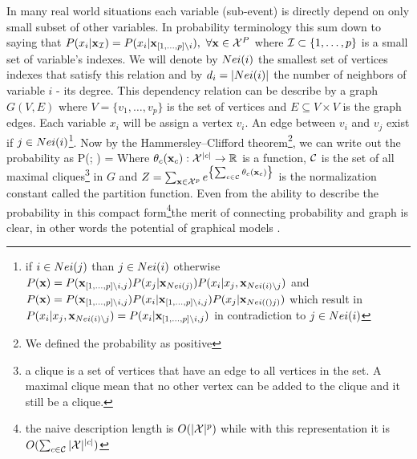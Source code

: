 In many real world situations each variable (sub-event) is directly depend on only small subset of other variables.
In probability terminology this sum down to saying that $P(x_i |{\bf x}_{{\cal I}}) = P(x_i|{\bf x}_{[1,\ldots,p] \setminus i}),\  \forall {\bf x} \in {\cal X}^{P}$ where ${\cal I} \subset \{1,\ldots,p\}$  is a small set of variable's indexes.
We will denote by $Nei(i)$ the smallest set of vertices indexes that satisfy this relation and by $d_i = |Nei(i)|$ the number of neighbors of variable $i$ - its degree.  
This dependency relation can be describe by a graph $G(V,E)$ where $V = \{v_1,\ldots, v_p\}$ is the set of vertices and  $E \subseteq V \times V$ is the graph edges.
Each variable $x_i$ will be assign a vertex $v_i$. 
An edge between $v_i$ and $v_j$ exist if  $j \in Nei(i)$\footnote{if $i \in Nei(j)$ than $j \in Nei(i)$ otherwise $P({\bf x}) = P({\bf x}_{[1,\ldots,p]\setminus i,j}) P(x_j|{\bf x}_{Nei(j)}) P(x_i|x_j,{\bf x}_{Nei(i)\setminus j})$ and $P({\bf x}) = P({\bf x}_{[1,\ldots,p]\setminus i,j}) P(x_i|{\bf x}_{[1,\ldots,p]\setminus i,j}) P(x_j|{\bf x}_{Nei(()j)})$ which result in $P(x_i|x_j,{\bf x}_{Nei(i)\setminus j}) =   P(x_i|{\bf x}_{[1,\ldots,p]\setminus i,j})$ in contradiction to $j \in Nei(i)$}.
Now by the Hammersley–Clifford theorem\cite{hammersley1971markov}\footnote{We defined the probability as positive}, we can write out the probability as
\be
\label{eq:ciluqe_prob}
P(\xx; \thetav) =  
\ee
Where $\theta_{c}({\bf x}_{c}): {\cal X}^{|c|} \to \mathbb{R}$  is a function, ${\cal C}$ is the set of all maximal cliques\footnote{a clique is a set of vertices that have an edge to all vertices in the set. A maximal clique mean that no other vertex can be added to the clique and it still be a clique.} in $G$ and $Z = \sum_{{\bf x} \in {\cal X}^p} e^{\left\{\sum_{c \in {\cal C}}\theta_{c}({\bf x}_{c})\right\}}$ is the normalization constant called the partition function.
Even from the ability to describe the probability in this compact form\footnote{the naive description length is $O(|{\cal X}|^p)$ while with this representation it is $O(\sum_{c \in {\cal C}} |{\cal X}|^{|c|})$}the merit of connecting probability and graph is clear, in other words the potential of graphical models \cite{koller2009probabilistic}.


